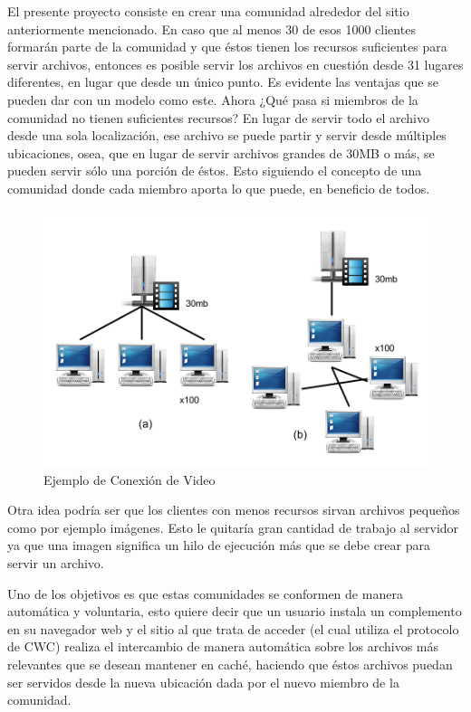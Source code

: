 El presente proyecto consiste en crear una comunidad alrededor del sitio anteriormente mencionado. En caso que al menos 30 de esos 1000 clientes formarán parte de la comunidad y que éstos tienen los recursos suficientes para servir archivos, entonces es posible servir los archivos en cuestión desde 31 lugares diferentes, en lugar que desde un único punto. Es evidente las ventajas que se pueden dar con un modelo como este. Ahora ¿Qué pasa si miembros de la comunidad no tienen suficientes recursos? En lugar de servir todo el archivo desde una sola localización, ese archivo se puede partir y servir desde múltiples ubicaciones, osea, que en lugar de servir archivos grandes de 30MB o más, se pueden servir sólo una porción de éstos. Esto siguiendo el concepto de una comunidad donde cada miembro aporta lo que puede, en beneficio de todos. 

\begin{figure}[h]
  \centering
    \includegraphics[scale=0.7]{gfx/conexion_video}
  \caption{Ejemplo de Conexión de Video}
  \label{conexionvideo}
\end{figure}

Otra idea podría ser que los clientes con menos recursos sirvan archivos pequeños como por ejemplo imágenes. Esto le quitaría gran cantidad de trabajo al servidor ya que una imagen significa un hilo de ejecución más que se debe crear para servir un archivo.

Uno de los objetivos es que estas comunidades se conformen de manera automática y voluntaria, esto quiere decir que un usuario instala un complemento en su navegador web y el sitio al que trata de acceder (el cual utiliza el protocolo de CWC) realiza el intercambio de manera automática sobre los archivos más relevantes que se desean mantener en caché, haciendo que éstos archivos puedan ser servidos desde la nueva ubicación dada por el nuevo miembro de la comunidad.

